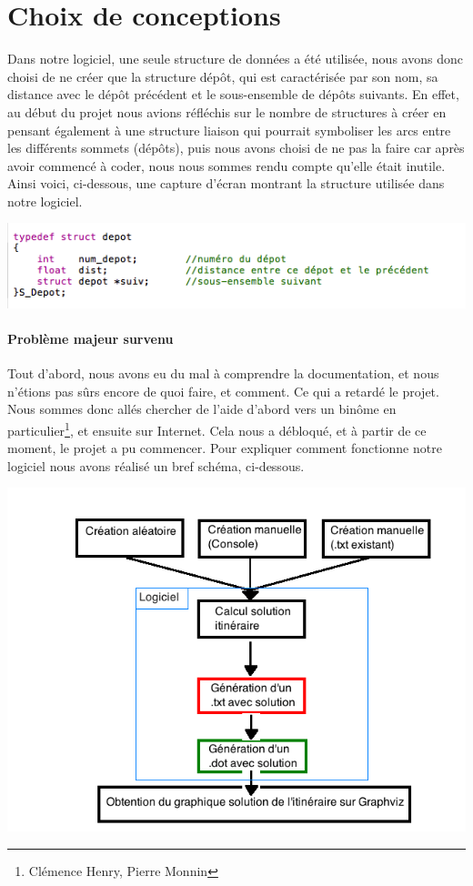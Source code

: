 \documentclass[12pt,a4paper]{report}
\begin{document}
\section{Choix de conceptions}
Dans notre logiciel, une seule structure de données a été utilisée, nous avons donc choisi de ne créer que la structure dépôt, qui est caractérisée par son nom, sa distance avec le dépôt précédent et le sous-ensemble de dépôts suivants. En effet, au début du projet nous avions réfléchis sur le nombre de structures à créer en pensant également à une structure liaison qui pourrait symboliser les arcs entre les différents sommets (dépôts), puis nous avons choisi de ne pas la faire car après avoir commencé à coder, nous nous sommes rendu compte qu'elle était inutile. Ainsi voici, ci-dessous, une capture d'écran montrant la structure utilisée dans notre logiciel.

\begin{center}
\includegraphics[scale=0.7]{capture2.png}
\end{center} 

\paragraph{Problème majeur survenu}
Tout d'abord, nous avons eu du mal \`{a} comprendre la documentation, et nous n'\'{e}tions pas s\^urs encore de quoi faire, et comment. Ce qui a retard\'{e} le projet. Nous sommes donc all\'{e}s chercher de l'aide d'abord vers un binôme en particulier\footnote{Clémence Henry, Pierre Monnin}, et ensuite sur Internet. Cela nous a d\'{e}bloqu\'{e}, et \`{a} partir de ce moment, le projet a pu commencer.
Pour expliquer comment fonctionne notre logiciel nous avons réalisé un bref schéma, ci-dessous.
\begin{center}
\includegraphics[scale=0.6]{conception.png}
\end{center} 
\end{document}
